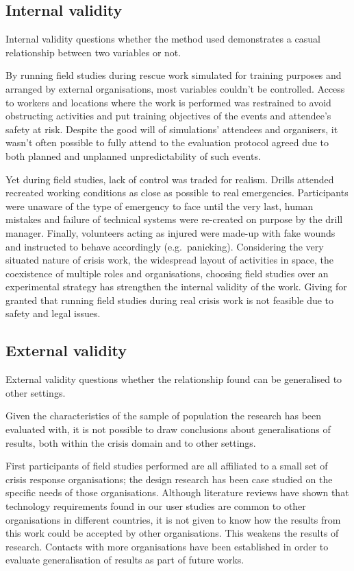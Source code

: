 \subsection{Internal validity}\label{internal-validity}

Internal validity questions whether the method used demonstrates a casual relationship between two variables or not.

By running field studies during rescue work simulated for training purposes and arranged by external organisations, most variables couldn't be controlled. Access to workers and locations where the work is performed was restrained to avoid obstructing activities and put training objectives of the events and attendee's safety at risk. Despite the good will of simulations' attendees and organisers, it wasn't often possible to fully attend to the evaluation protocol agreed due to both planned and unplanned unpredictability of such events.

Yet during field studies, lack of control was traded for realism. Drills attended recreated working conditions as close as possible to real emergencies. Participants were unaware of the type of emergency to face until the very last, human mistakes and failure of technical systems were re-created on purpose by the drill manager. Finally, volunteers acting as injured were made-up with fake wounds and instructed to behave accordingly (e.g.~panicking). Considering the very situated nature of crisis work, the widespread layout of activities in space, the coexistence of multiple roles and organisations, choosing field studies over an experimental strategy has strengthen the internal validity of the work. Giving for granted that running field studies during real crisis work is not feasible due to safety and legal issues.

\subsection{External validity}\label{external-validity}

External validity questions whether the relationship found can be generalised to other settings.

Given the characteristics of the sample of population the research has been evaluated with, it is not possible to draw conclusions about generalisations of results, both within the crisis domain and to other settings.

First participants of field studies performed are all affiliated to a small set of crisis response organisations; the design research has been case studied on the specific needs of those organisations. Although literature reviews have shown that technology requirements found in our user studies are common to other organisations in different countries, it is not given to know how the results from this work could be accepted by other organisations. This weakens the results of research. Contacts with more organisations have been established in order to evaluate generalisation of results as part of future works.

